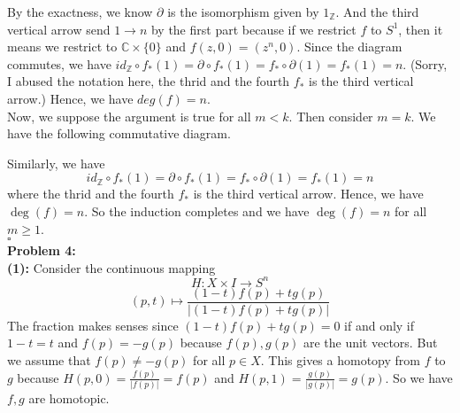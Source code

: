 \documentclass[12pt]{amsart}
\newcommand{\C}{\mathbb{C}}
\newcommand{\Z}{\mathbb{Z}}
\begin{document}
\begin{center}
\end{center}
By the exactness, we know $\partial$ is the isomorphism given by $1_\Z$. And the third vertical arrow send $1\to n$ by the first part because if we restrict $f$ to $S^1$, then it means we restrict to $\C\times \{0\}$ and $f(z,0)=(z^n,0)$. Since the diagram commutes, we have $id_\Z\circ f_\ast(1)=\partial\circ f_\ast(1)=f_\ast\circ \partial(1)=f_\ast(1)=n$. (Sorry, I abused the notation here, the thrid and the fourth $f_\ast$ is the third vertical arrow.) Hence, we have $deg(f)=n$.\\
Now, we suppose the argument is true for all $m< k$. Then consider $m=k$. We have the following commutative diagram.
\begin{center}
\end{center}
Similarly, we have 
\[id_\Z\circ f_\ast(1)=\partial\circ f_\ast(1)=f_\ast\circ \partial(1)=f_\ast(1)=n\]
where the thrid and the fourth $f_\ast$ is the third vertical arrow. Hence, we have $\deg(f)=n$. So the induction completes and we have $\deg(f)=n$ for all $m\geq 1$.
\\\phantom{qed}\hfill$\square$\\
\textbf{Problem 4:}\\
\textbf{(1): }Consider the continuous mapping 
\[H:X\times I\to S^n\]
\[(p,t)\mapsto\frac{(1-t)f(p)+tg(p)}{|(1-t)f(p)+tg(p)|}\]
The fraction makes senses since $(1-t)f(p)+tg(p)=0$ if and only if $1-t=t$ and $f(p)=-g(p)$ because $f(p),g(p)$ are the unit vectors. But we assume that $f(p)\neq -g(p)$ for all $p\in X$. This gives a homotopy from $f$ to $g$ because $H(p,0)=\frac{f(p)}{|f(p)|}=f(p)$ and $H(p,1)=\frac{g(p)}{|g(p)|}=g(p)$. So we have $f,g$ are homotopic.\\
\end{document}
